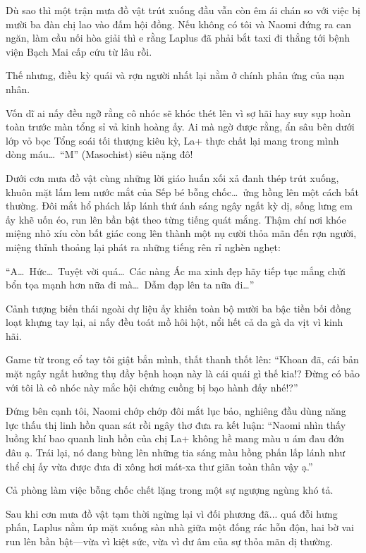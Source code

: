 \documentclass[../main.tex]{subfiles}
\begin{document}
Dù sao thì một trận mưa đồ vật trút xuống đầu vẫn còn êm ái chán so với việc bị mười ba đàn chị lao vào đấm hội đồng. Nếu không có tôi và Naomi đứng ra can ngăn, làm cầu nối hòa giải thì e rằng Laplus đã phải bắt taxi đi thẳng tới bệnh viện Bạch Mai cấp cứu từ lâu rồi.

Thế nhưng, điều kỳ quái và rợn người nhất lại nằm ở chính phản ứng của nạn nhân.

Vốn dĩ ai nấy đều ngỡ rằng cô nhóc sẽ khóc thét lên vì sợ hãi hay suy sụp hoàn toàn trước màn tổng sỉ vả kinh hoàng ấy. Ai mà ngờ được rằng, ẩn sâu bên dưới lớp vỏ bọc Tổng soái tối thượng kiêu kỳ, La+ thực chất lại mang trong mình dòng máu\dots\ ``M'' (Masochist) siêu nặng đô!

Dưới cơn mưa đồ vật cùng những lời giáo huấn xối xả đanh thép trút xuống, khuôn mặt lấm lem nước mắt của Sếp bé bỗng chốc\dots\ ửng hồng lên một cách bất thường. Đôi mắt hổ phách lấp lánh thứ ánh sáng ngây ngất kỳ dị, sống lưng em ấy khẽ uốn éo, run lên bần bật theo từng tiếng quát mắng. Thậm chí nơi khóe miệng nhỏ xíu còn bất giác cong lên thành một nụ cười thỏa mãn đến rợn người, miệng thỉnh thoảng lại phát ra những tiếng rên rỉ nghèn nghẹt:

``A\dots\ Hức\dots\ Tuyệt vời quá\dots\ Các nàng Ác ma xinh đẹp hãy tiếp tục mắng chửi bổn tọa mạnh hơn nữa đi mà\dots\ Dẫm đạp lên ta nữa đi\dots''


Cảnh tượng biến thái ngoài dự liệu ấy khiến toàn bộ mười ba bậc tiền bối đồng loạt khựng tay lại, ai nấy đều toát mồ hôi hột, nổi hết cả da gà da vịt vì kinh hãi.

Game từ trong cổ tay tôi giật bắn mình, thất thanh thốt lên: ``Khoan đã, cái bản mặt ngây ngất hưởng thụ đầy bệnh hoạn này là cái quái gì thế kia!? Đừng có bảo với tôi là cô nhóc này mắc hội chứng cuồng bị bạo hành đấy nhé!?''

Đứng bên cạnh tôi, Naomi chớp chớp đôi mắt lục bảo, nghiêng đầu dùng năng lực thấu thị linh hồn quan sát rồi ngây thơ đưa ra kết luận: ``Naomi nhìn thấy luồng khí bao quanh linh hồn của chị La+ không hề mang màu u ám đau đớn đâu ạ. Trái lại, nó đang bùng lên những tia sáng màu hồng phấn lấp lánh như thể chị ấy vừa được đưa đi xông hơi mát-xa thư giãn toàn thân vậy ạ.''

Cả phòng làm việc bỗng chốc chết lặng trong một sự ngượng ngùng khó tả.

Sau khi cơn mưa đồ vật tạm thời ngừng lại vì đối phương đã... quá đỗi hưng phấn, Laplus nằm úp mặt xuống sàn nhà giữa một đống rác hỗn độn, hai bờ vai run lên bần bật—vừa vì kiệt sức, vừa vì dư âm của sự thỏa mãn dị thường.
\end{document}
